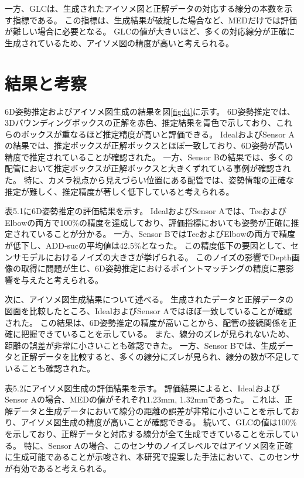 一方、GLCは、生成されたアイソメ図と正解データの対応する線分の本数を示す指標である。
この指標は、生成結果が破綻した場合など、MEDだけでは評価が難しい場合に必要となる。
GLCの値が大きいほど、多くの対応線分が正確に生成されているため、アイソメ図の精度が高いと考えられる。

\section{結果と考察}
6D姿勢推定およびアイソメ図生成の結果を図\ref{fig:f4}に示す。
6D姿勢推定では、3Dバウンディングボックスの正解を赤色、推定結果を青色で示しており、これらのボックスが重なるほど推定精度が高いと評価できる。
IdealおよびSensor Aの結果では、推定ボックスが正解ボックスとほぼ一致しており、6D姿勢が高い精度で推定されていることが確認された。
一方、Sensor Bの結果では、多くの配管において推定ボックスが正解ボックスと大きくずれている事例が確認された。
特に、カメラ視点から見えづらい位置にある配管では、姿勢情報の正確な推定が難しく、推定精度が著しく低下していると考えられる。

表5.1に6D姿勢推定の評価結果を示す。
IdealおよびSensor Aでは、TeeおよびElbowの両方で100\%の精度を達成しており、評価指標においても姿勢が正確に推定されていることが分かる。
一方、Sensor BではTeeおよびElbowの両方で精度が低下し、ADD-sucの平均値は42.5\%となった。
この精度低下の要因として、センサモデルにおけるノイズの大きさが挙げられる。
このノイズの影響でDepth画像の取得に問題が生じ、6D姿勢推定におけるポイントマッチングの精度に悪影響を与えたと考えられる。

次に、アイソメ図生成結果について述べる。
生成されたデータと正解データの図面を比較したところ、IdealおよびSensor Aではほぼ一致していることが確認された。
この結果は、6D姿勢推定の精度が高いことから、配管の接続関係を正確に把握できていることを示している。
また、線分のズレが見られないため、距離の誤差が非常に小さいことも確認できた。
一方、Sensor Bでは、生成データと正解データを比較すると、多くの線分にズレが見られ、線分の数が不足していることも確認された。

表5.2にアイソメ図生成の評価結果を示す。
評価結果によると、IdealおよびSensor Aの場合、MEDの値がそれぞれ1.23mm, 1.32mmであった。
これは、正解データと生成データにおいて線分の距離の誤差が非常に小さいことを示しており、アイソメ図生成の精度が高いことが確認できる。
続いて、GLCの値は100\%を示しており、正解データと対応する線分が全て生成できていることを示している。
特に、Sensor Aの場合、このセンサのノイズレベルではアイソメ図を正確に生成可能であることが示唆され、本研究で提案した手法において、このセンサが有効であると考えられる。

